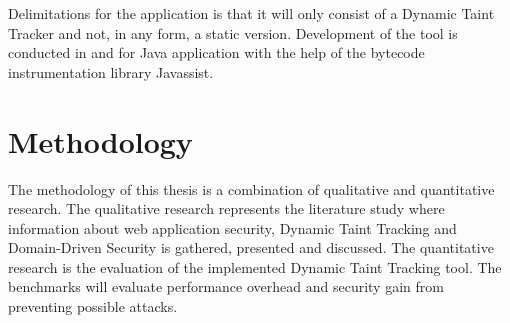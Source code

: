 Delimitations for the application is that it will only consist of a Dynamic Taint Tracker and not, in any form, a static version. Development of the tool is conducted in and for Java application with the help of the bytecode instrumentation library Javassist.


\section{Methodology}
\label{Methodology}
The methodology of this thesis is a combination of qualitative and quantitative research. The qualitative research represents the literature study where information about web application security, Dynamic Taint Tracking and Domain-Driven Security is gathered, presented and discussed. The quantitative research is the evaluation of the implemented Dynamic Taint Tracking tool. The benchmarks will evaluate performance overhead and security gain from preventing possible attacks.
